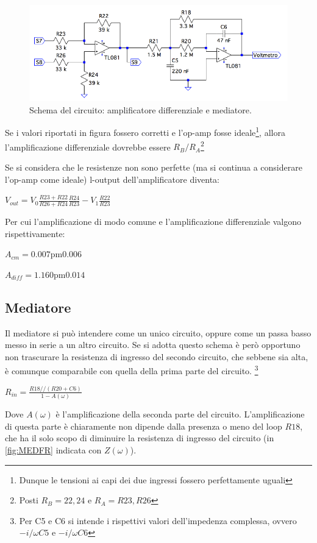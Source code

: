 \documentclass[a4paper,10pt]{article}
\begin{document}
\begin{figure}[H]
	\centering
	\includegraphics[width=\textwidth]{../grafici/DiffAmpAv.png}
	\caption{Schema del circuito: amplificatore differenziale e mediatore.}
	\label{fig:diffav}
\end{figure}

Se i valori riportati in figura fossero corretti e l'op-amp fosse ideale\footnote{Dunque le tensioni ai capi dei due ingressi fossero perfettamente uguali}, allora l'amplificazione differenziale dovrebbe essere $R_B/R_A$\footnote{Posti $R_B=22, 24$ e $R_A=R23, R26$}

Se si considera che le resistenze non sono perfette (ma si continua a considerare l'op-amp come ideale) l-output dell'amplificatore diventa:

$V_{out}=V_0\frac{R23+R22}{R26+R24}\frac{R24}{R23}-V_1\frac{R22}{R23}$

Per cui l'amplificazione di modo comune e l'amplificazione differenziale valgono rispettivamente:

$A_{cm}=\unit{0.007\pm 0.006}{}$

$A_{diff}=\unit{1.160 \pm 0.014}{}$ 

\subsection{Mediatore}

Il mediatore si può intendere come un unico circuito, oppure come un passa basso messo in serie a un altro circuito. Se si adotta questo schema è però opportuno non trascurare la resistenza di ingresso del secondo circuito, che sebbene sia alta, è comunque comparabile con quella della prima parte del circuito. \footnote{Per C5 e C6 si intende i rispettivi valori dell'impedenza complessa, ovvero $-i/\omega C5$ e $-i/\omega C6$}


$R_{in}=\frac{R18//(R20+C6)}{1-A(\omega)}$

Dove $A(\omega)$ è l'amplificazione della seconda parte del circuito.
L'amplificazione di questa parte è chiaramente non dipende dalla presenza o meno del loop $R18$, che ha il solo scopo di diminuire la resistenza di ingresso del circuito (in \cref{fig:MEDFR} indicata con $Z(\omega)$).
\end{document}
